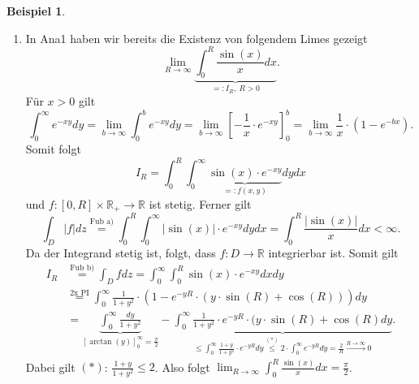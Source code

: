 \documentclass[a4paper]{report}
\newcommand{\R}{\mathbb{R}}
\newcommand{\toInf}{\rightarrow \infty}
\newcommand{\limToInf}[1]{\lim_{#1 \toInf}}
\newcommand{\jhyperref}[2]{\hyperref[j_#1]{#2}}
\newcommand{\jabb}[3]{ #1: #2 \rightarrow #3 }
\newcommand{\jshortlinkFubiniA}{\jhyperref{FubiniA}{\text{Fub a)}}}
\newcommand{\jshortlinkFubiniB}{\jhyperref{FubiniB}{\text{Fub b)}}}
\theoremstyle{plain}
\theoremstyle{definition}
\newtheorem*{expl*}{Beispiel}
\begin{document}
{{{{\begin{expl*}
\begin{enumerate}
        \item
            In Ana1 haben wir bereits die Existenz von folgendem Limes gezeigt
            \begin{displaymath}
                \limToInf{R} \underbrace{\int_0^R \frac{\sin(x)}{x}dx}_{=:I_R, \ R>0}.
            \end{displaymath}
            Für $x>0$ gilt 
            \begin{displaymath}
                \int_0^\infty e^{-xy}dy = \limToInf{b} \int_0^b e^{-xy}dy = \limToInf{b} \left[-\frac{1}{x}\cdot e^{-xy}\right]_0^b = \limToInf{b} \frac{1}{x} \cdot (1-e^{-bx}).
            \end{displaymath}
            Somit folgt
            \begin{displaymath}
                I_R = \int_0^R \int_0^\infty \underbrace{\sin(x)\cdot e^{-xy}}_{=:f(x,y)} dydx
            \end{displaymath}
            und $\jabb{f}{[0,R]\times \R_+}{\R}$ ist stetig. Ferner gilt
            \begin{displaymath}
                \int_D |f| dz \overset{\jshortlinkFubiniA}{=} \int_0^R\int_0^\infty |\sin(x)|\cdot e^{-xy} dydx = \int_0^R \frac{|\sin(x)|}{x}dx < \infty.
            \end{displaymath}
            Da der Integrand stetig ist, folgt, dass $\jabb{f}{D}{\R}$ integrierbar ist. Somit gilt
            \begin{displaymath}
                \begin{split}
                    I_R &\overset{\jshortlinkFubiniB}{=} \int_D f dz = \int_0^\infty \int_0^R \sin(x)\cdot e^{-xy} dxdy\\
                    &\overset{\text{2x PI}}{=} \int_0^\infty \frac{1}{1+y^2} \cdot \left(1-e^{-yR}\cdot(y\cdot \sin(R) + \cos(R)) \right)dy\\
                    &= \underbrace{\int_0^\infty \frac{dy}{1+y^2}}_{\left[\arctan(y)\right]_0^\infty =\frac{\pi}{2}} - \underbrace{\int_0^\infty \frac{1}{1+y^2} \cdot e^{-yR}\cdot (y\cdot \sin(R) + \cos(R)dy}_{\le \int_0^\infty \frac{1+y}{1+y^2} \cdot e^{-yR}dy \overset{(*)}{\le} 2\cdot \int_0^\infty e^{-yR}dy = \frac{2}{R} \xrightarrow{R\rightarrow\infty} 0}.
                \end{split}
            \end{displaymath}
            Dabei gilt $(*)$: $\frac{1+y}{1+y^2} \le 2$. Also folgt $\limToInf{R} \int_0^R \frac{\sin(x)}{x}dx = \frac{\pi}{2}$.
    \end{enumerate}
\end{expl*}
        
}}}}
\end{document}
